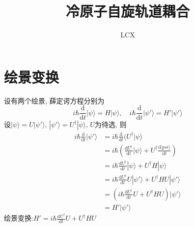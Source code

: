 \documentclass{article}
\newcommand{\md}{\mathrm{d}}
\begin{document}
\title{冷原子自旋轨道耦合}
\author{LCX}
\maketitle
\section{绘景变换}
设有两个绘景, 薛定谔方程分别为
\begin{equation*}
  i\hbar\frac{\md}{\md t}|\psi\rangle=H|\psi\rangle,\quad i\hbar\frac{\md}{\md t}|\psi'\rangle=H'|\psi'\rangle
\end{equation*}
设$|\psi\rangle=U|\psi'\rangle$, $|\psi'\rangle=U^\dag|\psi\rangle$, $U$为待选, 则
\begin{equation*}
  \begin{split}
     i\hbar\frac{\md}{\md t}|\psi'\rangle&=i\hbar\frac{\md}{\md t}(U^\dag|\psi\rangle \\
       &=i\hbar\left(\frac{\md U^\dag}{\md t}|\psi\rangle+U^\dag\frac{\md |psi\rangle}{\md t}\right) \\
       &=i\hbar\frac{\md U^\dag}{\md t}|\psi\rangle+U^\dag H|\psi\rangle\\
       &=i\hbar\frac{\md U^\dag}{\md t}U|\psi'\rangle+U^\dag HU|\psi'\rangle\\
       &=\left(i\hbar\frac{\md U^\dag}{\md t}U+U^\dag HU\right)|\psi'\rangle\\
       &=H'|\psi'\rangle
  \end{split}
\end{equation*}
绘景变换:$H'=i\hbar\frac{\md U^\dag}{\md t}U+U^\dag HU$
\end{document}
